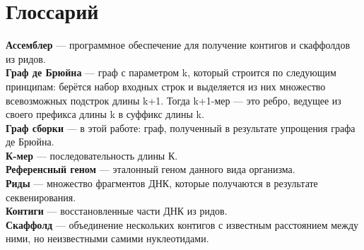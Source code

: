 \documentclass[14pt]{matmex-diploma-custom}
\begin{document}

\section*{Глоссарий}

\textbf{Ассемблер} --- программное обеспечение для получение контигов и скаффолдов из ридов.\\

\textbf{Граф де Брюйна} --- граф с параметром k, который строится по следующим принципам: берётся набор входных строк и выделяется из них множество всевозможных подстрок длины k+1. Тогда k+1-мер --- это ребро, ведущее из своего префикса длины k в суффикс длины k.\\

\textbf{Граф сборки} --- в этой работе: граф, полученный в результате упрощения графа де Брюйна.\\

\textbf{К-мер} --- последовательность длины К.\\


\textbf{Референсный геном} --- эталонный геном данного вида организма.\\

\textbf{Риды} --- множество фрагментов ДНК, которые получаются в результате секвенирования.\\

\textbf{Контиги} --- восстановленные части ДНК из ридов.\\

\textbf{Скаффолд} --- объединение нескольких контигов с известным расстоянием между ними, но неизвестными самими нуклеотидами.\\


\setmonofont[Mapping=tex-text]{CMU Typewriter Text}


\end{document}
